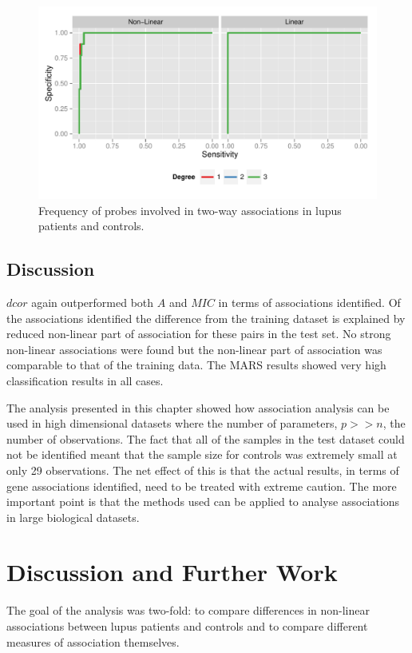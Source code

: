 \documentclass[a4paper, 12pt]{report}
\begin{document}
\begin{figure}[H]
\begin{centering}
\includegraphics[width=12cm]{bigROC}
\caption{Frequency of probes involved in two-way associations in lupus patients and controls.} 
\label{F:bigROC}
\end{centering}
\end{figure}


\section{Discussion}
$dcor$ again outperformed both $A$ and $MIC$ in terms of associations identified. Of the associations identified the difference from the training dataset is explained by reduced non-linear part of association for these pairs in the test set. No strong non-linear associations were found but the non-linear part of association was comparable to that of the training data. The MARS results showed very high classification results in all cases.

The analysis presented in this chapter showed how association analysis can be used in high dimensional datasets where the number of parameters, $p >> n$, the number of observations. The fact that all of the samples in the test dataset could not be identified meant that the sample size for controls was extremely small at only 29 observations. The net effect of this is that the actual results, in terms of gene associations identified, need to be treated with extreme caution. The more important point is that the methods used can be applied to analyse associations in large biological datasets. 

\chapter{Discussion and Further Work}
The goal of the analysis was two-fold: to compare differences in non-linear associations between lupus patients and controls and to compare different measures of association themselves. 
\end{document}
